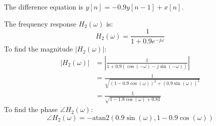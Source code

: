 The difference equation is \( y[n] = -0.9y[n-1] + x[n] \).

The frequency response \( H_2(\omega) \) is:
\[
H_2(\omega) = \frac{1}{1 + 0.9e^{-j\omega}}
\]
To find the magnitude \( |H_2(\omega)| \):
\[
\begin{aligned}
|H_2(\omega)| &= \left| \frac{1}{1 + 0.9(\cos(-\omega) - j\sin(-\omega))} \right| \\
&= \frac{1}{\sqrt{(1 - 0.9\cos(\omega))^2 + (0.9\sin(\omega))^2}} \\
&= \frac{1}{\sqrt{1 - 1.8\cos(\omega) + 0.81}}
\end{aligned}
\]
To find the phase \( \angle H_2(\omega) \):
\[
\angle H_2(\omega) = -\text{atan2}(0.9 \sin(\omega), 1 - 0.9 \cos(\omega))
\]